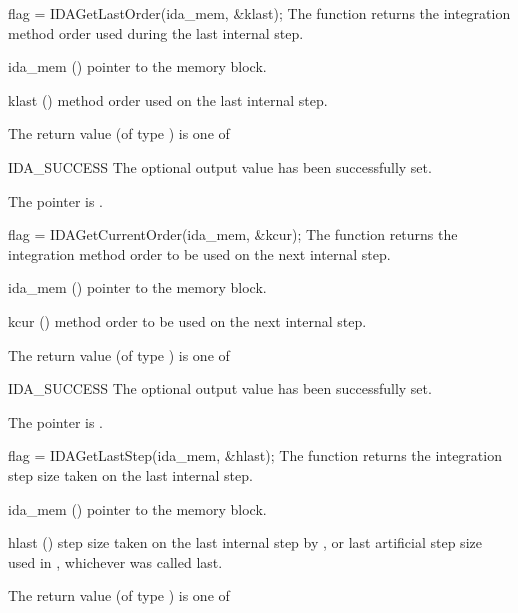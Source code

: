 {{}
{}
{
  flag = IDAGetLastOrder(ida\_mem, \&klast);
}
{
  The function  returns the
  integration method order used during the last internal step.
}
{
  \begin{args}
  \item[ida\_mem] ()
    pointer to the {\ida} memory block.
  \item[klast] ()
    method order used on the last internal step.
  \end{args}
}
{
  The return value  (of type ) is one of
  \begin{args}
  \item[IDA\_SUCCESS]
    The optional output value has been successfully set.
  \item[\Id{IDA\_MEM\_NULL}]
    The  pointer is .
  \end{args}
}
{}
{
  flag = IDAGetCurrentOrder(ida\_mem, \&kcur);
}
{
  The function  returns the
  integration method order to be used on the next internal step.
}
{
  \begin{args}
  \item[ida\_mem] ()
    pointer to the {\ida} memory block.
  \item[kcur] ()
    method order to be used on the next internal step.
  \end{args}
}
{
  The return value  (of type ) is one of
  \begin{args}
  \item[IDA\_SUCCESS]
    The optional output value has been successfully set.
  \item[\Id{IDA\_MEM\_NULL}]
    The  pointer is .
  \end{args}
}
{}
{
  flag = IDAGetLastStep(ida\_mem, \&hlast);
}
{
  The function  returns the
  integration step size taken on the last internal step.
}
{
  \begin{args}
  \item[ida\_mem] ()
    pointer to the {\ida} memory block.
  \item[hlast] ()
    step size taken on the last internal step by {\ida}, or last artificial
    step size used in , whichever was called last.
  \end{args}
}
{
  The return value  (of type ) is one of
}}
